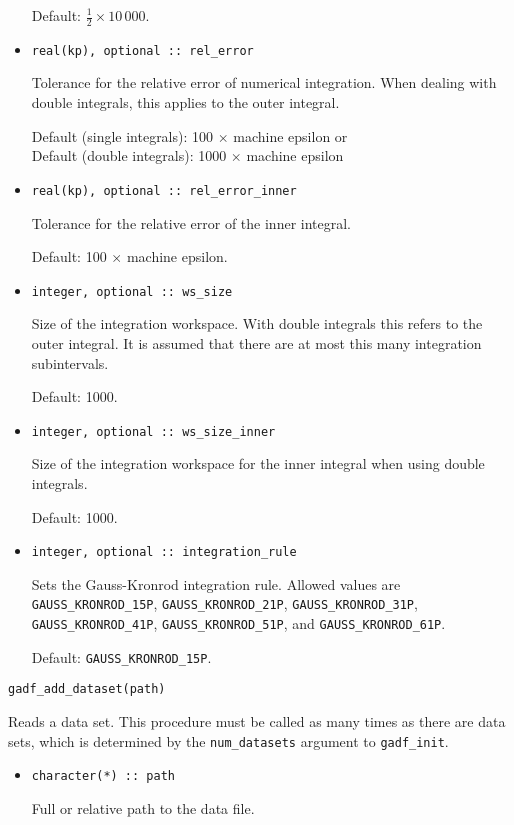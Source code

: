 \documentclass{article}
\begin{document}
\begin{itemize}
  Default: $\frac{1}{2}\times10\,000$.
\item
\begin{verbatim}
real(kp), optional :: rel_error
\end{verbatim}
  Tolerance for the relative error of numerical integration. When dealing with double integrals, this applies to the outer integral.

  Default (single integrals): 100 $\times$ machine epsilon or\\
  Default (double integrals): 1000 $\times$ machine epsilon
\item
\begin{verbatim}
real(kp), optional :: rel_error_inner
\end{verbatim}
  Tolerance for the relative error of the inner integral.

  Default: 100 $\times$ machine epsilon.
\item
\begin{verbatim}
integer, optional :: ws_size
\end{verbatim}
  Size of the integration workspace. With double integrals this refers to the outer integral. It is assumed that there are at most this many integration subintervals.

  Default: 1000.
\item
\begin{verbatim}
integer, optional :: ws_size_inner
\end{verbatim}
  Size of the integration workspace for the inner integral when using double integrals.

  Default: 1000.
\item
\begin{verbatim}
integer, optional :: integration_rule
\end{verbatim}
  Sets the Gauss-Kronrod integration rule. Allowed values are\\
  \verb+GAUSS_KRONROD_15P+, \verb+GAUSS_KRONROD_21P+,
  \verb+GAUSS_KRONROD_31P+,\\
  \verb+GAUSS_KRONROD_41P+, \verb+GAUSS_KRONROD_51P+, and
  \verb+GAUSS_KRONROD_61P+.

  Default: \verb+GAUSS_KRONROD_15P+.
\end{itemize}

\begin{verbatim}
gadf_add_dataset(path)
\end{verbatim}
Reads a data set. This procedure must be called as many times as there are data sets, which is determined by the \verb+num_datasets+ argument to \verb+gadf_init+.
\begin{itemize}
\item
\begin{verbatim}
character(*) :: path
\end{verbatim}
  Full or relative path to the data file.
\end{itemize}
\end{document}
